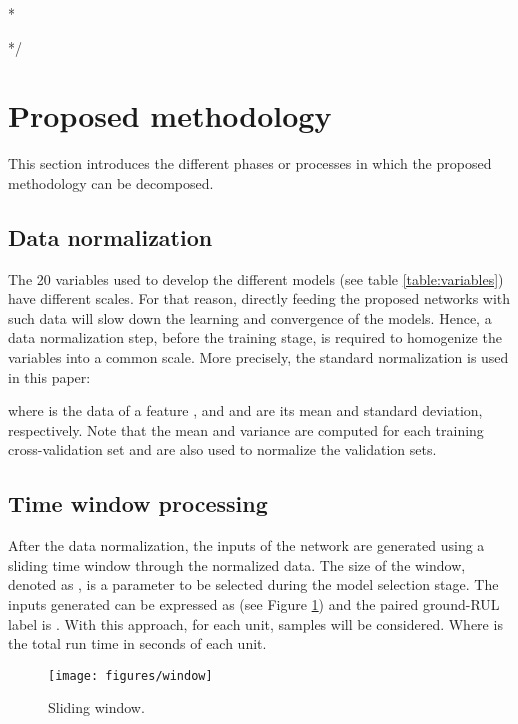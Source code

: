 \documentclass[PHM, 2021]{PHMSociety}
\begin{document}
\/*















*/

\section{Proposed methodology}

This section introduces the different phases or processes in which the proposed methodology can be decomposed.

\subsection{Data normalization}

The 20 variables used to develop the different models (see table \ref{table:variables}) have different scales. For that reason, directly feeding the proposed networks with such data will slow down the learning and convergence of the models. Hence, a data normalization step, before the training stage, is required to homogenize the variables into a common scale. More precisely, the standard normalization is used in this paper:



where  is the data of a feature , and  and  are its mean and standard deviation, respectively. Note that the mean and variance are computed for each training cross-validation set and are also used to normalize the validation sets.

\subsection{Time window processing}

After the data normalization, the inputs of the network are generated using a sliding time window through the normalized data. The size of the window, denoted as , is a parameter to be selected during the model selection stage. The inputs generated can be expressed as  (see Figure \ref{fig:window}) and the paired ground-RUL label is . With this approach, for each unit,  samples will be considered. Where  is the total run time in seconds of each unit.

\begin{figure}[t]
\centering
\texttt{[image: figures/window]}
\caption{Sliding window.}
\label{fig:window}
\end{figure}
\end{document}
